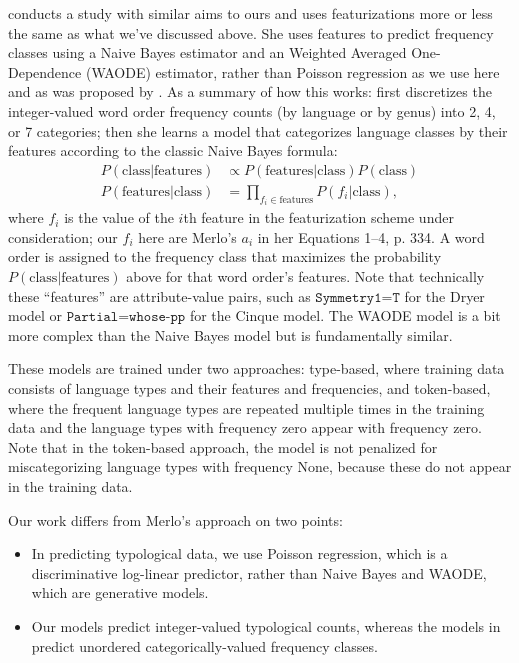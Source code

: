 \documentclass[11pt]{article}
\begin{document}
\citet{merlo2015predicting} conducts a study with similar aims to ours and uses featurizations more or less the same as what we've discussed above.
She uses features to predict frequency classes using a Naive Bayes estimator and an Weighted Averaged One-Dependence (WAODE) estimator, rather than Poisson regression as we use here and as was proposed by \citet{cysouw2010dealing}.
As a summary of how this works: \citet{merlo2015predicting} first discretizes the integer-valued word order frequency counts (by language or by genus) into 2, 4, or 7 categories; then she learns a model that categorizes language classes by their features according to the classic Naive Bayes formula:
\begin{align*}
  \nonumber
  P(\text{class}|\text{features}) &\propto P(\text{features}|\text{class}) P(\text{class}) \\
  \nonumber
  P(\text{features}|\text{class}) &= \prod_{f_i \in \text{features}} P(f_i | \text{class}),
\end{align*}
where $f_i$ is the value of the $i$th feature in the featurization scheme under consideration; our $f_i$ here are Merlo's $a_i$ in her Equations 1--4, p. 334. A word order is assigned to the frequency class that maximizes the probability $P(\text{class}|\text{features})$ above for that word order's features.
Note that technically these ``features'' are attribute-value pairs, such as $\texttt{Symmetry1=T}$ for the Dryer model or $\texttt{Partial=whose-pp}$ for the Cinque model.
The WAODE model is a bit more complex than the Naive Bayes model but is fundamentally similar.

These models are trained under two approaches: type-based, where training data consists of language types and their features and frequencies, and token-based, where the frequent language types are repeated multiple times in the training data and the language types with frequency zero appear with frequency zero.
Note that in the token-based approach, the model is not penalized for miscategorizing language types with frequency None, because these do not appear in the training data.

Our work differs from Merlo's approach on two points:
\begin{itemize}
\item In predicting typological data, we use Poisson regression, which is a discriminative log-linear predictor, rather than Naive Bayes and WAODE, which are generative models.
\item Our models predict integer-valued typological counts, whereas the models in \citet{merlo2015predicting} predict unordered categorically-valued frequency classes.
\end{itemize}
\end{document}
